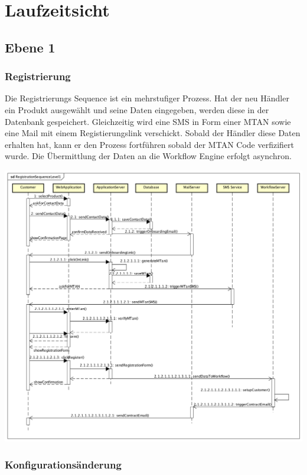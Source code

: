 \graphicspath{{./images/}}

\chapter{Laufzeitsicht}

\section{Ebene 1}

\subsection{Registrierung}

Die Registrierungs Sequence ist ein mehrstufiger Prozess. Hat der neu Händler ein Produkt ausgewählt und seine Daten eingegeben, werden diese in der Datenbank gespeichert. Gleichzeitig wird eine SMS in Form einer MTAN sowie eine Mail mit einem Registierungslink verschickt. Sobald der Händler diese Daten erhalten hat, kann er den Prozess fortführen sobald der MTAN Code verfizifiert wurde. Die Übermittlung der Daten an die Workflow Engine erfolgt asynchron.
\begin{center}
	\includegraphics[scale=0.44]{RegistrationSequenceLevel1.png}
\end{center}
\newpage

\subsection{Konfigurationsänderung}

